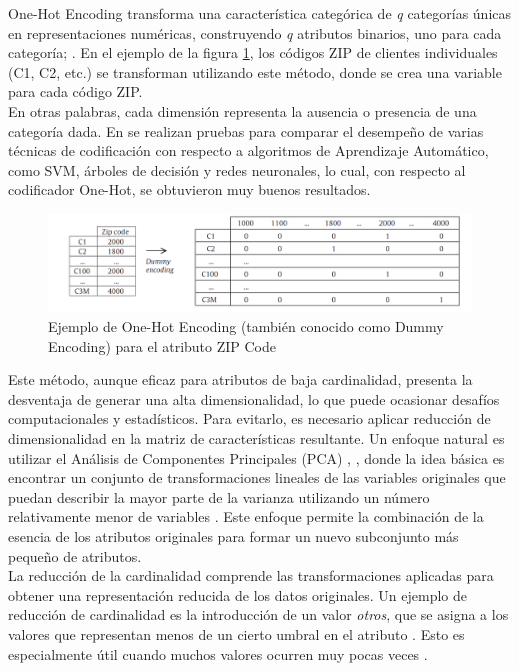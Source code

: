 One-Hot Encoding transforma una característica categórica de \textit{q} categorías únicas en representaciones numéricas, construyendo \textit{q} atributos binarios, uno para cada categoría; \citep{avanzi2023machine}. En el ejemplo de la figura \ref{fig:one-hot-ejemplo}, los códigos ZIP de clientes individuales (C1, C2, etc.) se transforman utilizando este método, donde se crea una variable  para cada código ZIP. \\
En otras palabras, cada dimensión representa la ausencia o presencia de una categoría dada. En \citep{hooi2022feature} se realizan pruebas para comparar el desempeño de varias técnicas de codificación con respecto a algoritmos de Aprendizaje Automático, como SVM, árboles de decisión y redes neuronales, lo cual, con respecto al codificador One-Hot, se obtuvieron muy buenos resultados. \\
\begin{figure}[H]
	\centering
	\includegraphics[width=0.8\linewidth]{"figuras/capi 1/one-hot-ejemplo"}
	\caption{Ejemplo de One-Hot Encoding (también conocido como Dummy Encoding) para el atributo ZIP Code}
	\label{fig:one-hot-ejemplo}
\end{figure}
Este método, aunque eficaz para atributos de baja cardinalidad, presenta la desventaja de generar una alta dimensionalidad, lo que puede ocasionar desafíos computacionales y estadísticos. Para evitarlo, es necesario aplicar reducción de dimensionalidad en la matriz de características resultante. Un enfoque natural es utilizar el Análisis de Componentes Principales (PCA) \citep{mahmood2022accurate}, \citep{kasemtaweechok2021large} , donde la idea básica es encontrar un conjunto de transformaciones lineales de las variables originales que puedan describir la mayor parte de la varianza utilizando un número relativamente menor de variables \citep{garcia2015data}. Este enfoque permite la combinación de la esencia de los atributos originales para formar un nuevo subconjunto más pequeño de atributos. \\
La reducción de la cardinalidad comprende las transformaciones aplicadas para obtener una representación reducida de los datos originales. Un ejemplo de reducción de cardinalidad es la introducción de un valor \textit{otros}, que se asigna a los valores que representan menos de un cierto umbral en el atributo \citep{casas2019data}. Esto es especialmente útil cuando muchos valores ocurren muy pocas veces \citep{ventevogel2020construction}.

